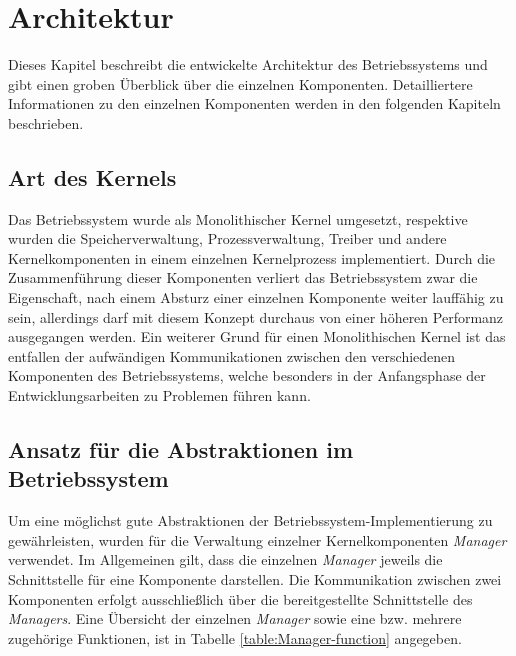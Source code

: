 \section{Architektur}
\label{chapArch}
Dieses Kapitel beschreibt die entwickelte Architektur des Betriebssystems und gibt einen groben Überblick über die einzelnen Komponenten. Detailliertere Informationen zu den einzelnen Komponenten werden in den folgenden Kapiteln beschrieben.

\subsection{Art des Kernels}
Das Betriebssystem wurde als Monolithischer Kernel umgesetzt, respektive wurden die Speicherverwaltung, Prozessverwaltung, Treiber und andere Kernelkomponenten in einem einzelnen Kernelprozess implementiert. Durch die Zusammenführung dieser Komponenten verliert das Betriebssystem zwar die Eigenschaft, nach einem Absturz einer einzelnen Komponente weiter lauffähig zu sein, allerdings darf mit diesem Konzept durchaus von einer höheren Performanz ausgegangen werden.
Ein weiterer Grund für einen Monolithischen Kernel ist das entfallen der aufwändigen Kommunikationen zwischen den verschiedenen Komponenten des Betriebssystems, welche besonders in der Anfangsphase der Entwicklungsarbeiten zu Problemen führen kann.

\subsection{Ansatz für die Abstraktionen im Betriebssystem}
Um eine möglichst gute Abstraktionen der Betriebssystem-Implementierung zu gewährleisten, wurden für die Verwaltung einzelner Kernelkomponenten \textit{Manager} verwendet. Im Allgemeinen gilt, dass die einzelnen \textit{Manager} jeweils die Schnittstelle für eine Komponente darstellen. Die Kommunikation zwischen zwei Komponenten erfolgt ausschließlich über die bereitgestellte Schnittstelle des \textit{Managers}. Eine Übersicht der einzelnen \textit{Manager} sowie eine bzw. mehrere zugehörige Funktionen, ist in Tabelle \ref{table:Manager-function} angegeben.

